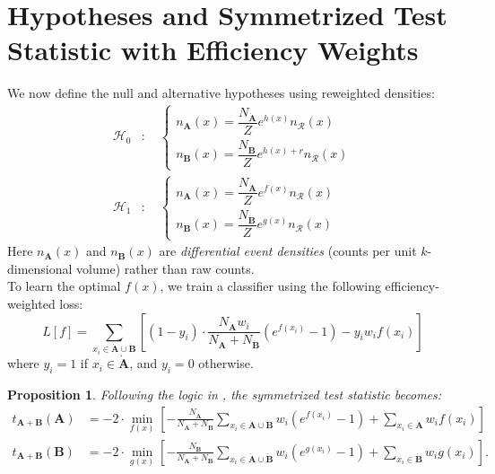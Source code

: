 \documentclass{article}
\newtheorem{proposition}[theorem]{Proposition}
\newcommand{\dataset}[1]{{\mathbf{#1}}}         %
\newcommand{\reco}[1]{{\dataset{\dot{#1}}}}     %
\newcommand{\dist}[1]{{n_{\dataset{#1}}(x)}}    %
\newcommand{\refdist}[1][x]{n_{\mathcal{R}}({#1})}  %
\begin{document}
\section{Hypotheses and Symmetrized Test Statistic with Efficiency Weights}
We now define the null and alternative hypotheses using reweighted densities:
\[
\begin{aligned}
\mathcal{H}_0 &: \quad
\begin{cases}
    {\dist{A}} = \dfrac{N_\reco{A}}{Z} e^{h(x)} \refdist \\
    {\dist{B}} = \dfrac{N_\reco{B}}{Z} e^{h(x) + r} \refdist
\end{cases} \\
\mathcal{H}_1 &: \quad
\begin{cases}
    {\dist{A}} = \dfrac{N_\reco{A}}{Z} e^{f(x)} \refdist \\
    {\dist{B}} = \dfrac{N_\reco{B}}{Z} e^{g(x)} \refdist
\end{cases}
\end{aligned}
\]
Here \(n_{\dataset{A}}(x)\) and \(n_{\dataset{B}}(x)\) are \emph{differential event densities} (counts per unit \(k\)-dimensional volume) rather than raw counts.\\

To learn the optimal \( f(x) \), we train a classifier using the following efficiency-weighted loss:
\[
L[f] = \sum_{x_i \in \reco{A} \cup \reco{B}} 
\left[
    (1 - y_i) \cdot \frac{N_\reco{A} w_i}{N_\reco{A} + N_\reco{B}} (e^{f(x_i)} - 1)
    - y_i w_i f(x_i)
\right]
\]
where \( y_i = 1 \) if \( x_i \in \reco{A} \), and \( y_i = 0 \) otherwise.


\begin{proposition}\label{sec:full-proof-t}
    Following the logic in \cite{LastDDPpaper}, the symmetrized test statistic becomes:
\[
\begin{aligned} \label{eq:symmetrized_test_statistics}
t_{\dataset{A}+\dataset{B}}(\dataset{A}) &= -2 \cdot \min_{f(x)}
\left[
    - \frac{N_{\reco{A}}}{N_{\reco{A}} + N_{\reco{B}}}
    \sum_{x_i \in \reco{A} \cup \reco{B}} w_i (e^{f(x_i)} - 1)
    + \sum_{x_i \in \reco{A}} w_i f(x_i)
\right] \\
 t_{\dataset{A}+\dataset{B}}(\dataset{B}) &= -2 \cdot \min_{g(x)}
\left[
    - \frac{N_{\reco{B}}}{N_{\reco{A}} + N_{\reco{B}}}
    \sum_{x_i \in \reco{A} \cup \reco{B}} w_i (e^{g(x_i)} - 1)
    + \sum_{x_i \in \reco{B}} w_i g(x_i)
\right].
\end{aligned}
\]
\end{proposition}
\end{document}
